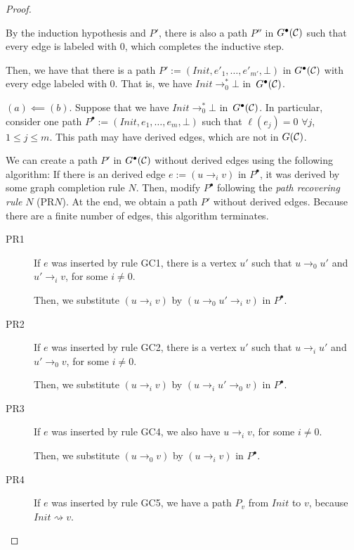 \begin{proof}
\begin{description}
\begin{description}
        By the induction hypothesis and $P'$, there is also a path $P''$ in $G^\bullet(\mathcal{C})$ such that every edge is labeled with 0, which completes the inductive step.
    \end{description}
    
    Then, we have that there is a path $P' := (Init, e'_1, \dots, e'_{m'}, \bot)$ in $G^\bullet(\mathcal{C})$ with every edge labeled with 0. That is, we have $Init \to_0^* \bot$ in~$G^\bullet(\mathcal{C})$.
    
    \item $(a) \impliedby (b)$. Suppose that we have $Init \to_0^* \bot$ in~$G^\bullet(\mathcal{C})$. In particular, consider one path $P^\bullet := (Init, e_1, \dots, e_m, \bot)$ such that $\ell(e_j) = 0$ $\forall j$, $1 \leq j \leq m$. This path may have derived edges, which are not in $G(\mathcal{C})$. 
    
    We can create a path $P'$ in $G^\bullet(\mathcal{C})$ without derived edges using the following algorithm: If there is an derived edge $e := (u \to_i v)$ in $P^\bullet$, it was derived by some graph completion rule $N$. Then, modify $P^\bullet$ following the \emph{path recovering rule} $N$ (PR$N$). At the end, we obtain a path $P'$ without derived edges. Because there are a finite number of edges, this algorithm terminates. 
    
    \begin{description}
        \item[PR1] If $e$ was inserted by rule GC1, there is a vertex $u'$ such that $u \to_0 u'$ and $u' \to_i v$, for some $i \neq 0$. 
        
        Then, we substitute $(u \to_i v)$ by $(u \to_0 u' \to_i v)$ in $P^\bullet$.
        
        \item[PR2] If $e$ was inserted by rule GC2, there is a vertex $u'$ such that $u \to_i u'$ and $u' \to_0 v$, for some $i \neq 0$. 
        
        Then, we substitute $(u \to_i v)$ by $(u \to_i u' \to_0 v)$ in $P^\bullet$.
        
        \item[PR3] If $e$ was inserted by rule GC4, we also have $u \to_i v$, for some $i \neq 0$.
        
        Then, we substitute $(u \to_0 v)$ by $(u \to_i v)$ in $P^\bullet$.
        
        \item[PR4] If $e$ was inserted by rule GC5, we have a path $P_v$ from $Init$ to $v$, because $Init \rightsquigarrow v$.
        

\end{description}
\end{description}
\end{proof}
